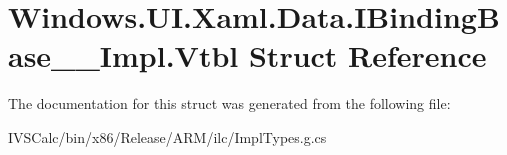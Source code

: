 \hypertarget{struct_windows_1_1_u_i_1_1_xaml_1_1_data_1_1_i_binding_base_____impl_1_1_vtbl}{}\section{Windows.\+U\+I.\+Xaml.\+Data.\+I\+Binding\+Base\+\_\+\+\_\+\+Impl.\+Vtbl Struct Reference}
\label{struct_windows_1_1_u_i_1_1_xaml_1_1_data_1_1_i_binding_base_____impl_1_1_vtbl}


The documentation for this struct was generated from the following file\+:\begin{DoxyCompactItemize}
\item 
I\+V\+S\+Calc/bin/x86/\+Release/\+A\+R\+M/ilc/Impl\+Types.\+g.\+cs\end{DoxyCompactItemize}
